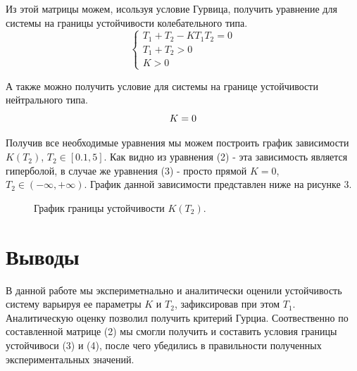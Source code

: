 \documentclass[a4paper, 11pt]{article}
\begin{document}
Из этой матрицы можем, исользуя условие Гурвица, получить уравнение для системы на границы устойчивости колебательного типа.
\begin{equation}
    \begin{cases}
        T_1 + T_2 - K T_1 T_2 = 0 \\
        T_1 + T_2 > 0 \\
        K > 0
    \end{cases}
\end{equation}

А также можно получить условие для системы на границе устойчивости нейтрального типа.
\begin{equation}
    K = 0 \\
\end{equation}

Получив все необходимые уравнения мы можем построить график зависимости $K(T_2)$, $T_2 \in [0.1, 5]$. Как видно из уравнения (2) - эта зависимость является гиперболой, в случае же уравнения (3) - просто прямой $K = 0$, $T_2 \in (-\infty, +\infty)$. График данной зависимости представлен ниже на рисунке 3.
\begin{figure}[h!]
    \centering
    \caption{График границы устойчивости $K(T_2)$.}
\end{figure}
\section*{Выводы}
В данной работе мы экспериметнально и аналитически оценили устойчивость систему варьируя ее параметры $K$ и $T_2$, зафиксировав при этом $T_1$. Аналитическую оценку позволил получить критерий Гурциа. Соотвественно по составленной матрице (2) мы смогли получить и составить условия границы устойчивоси (3) и (4), после чего убедились в правильности полученных экспериментальных значений.
\end{document}
